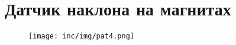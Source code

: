 \chapter{Датчик наклона на магнитах}
\label{cha:appendix4}

\begin{figure}
\centering
\texttt{[image: inc/img/pat4.png]}
\end{figure}

